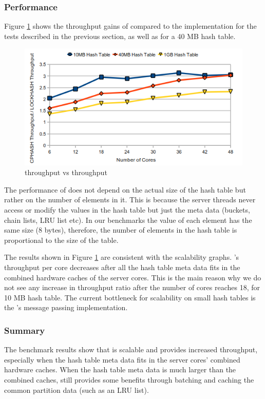 \subsubsection{Performance}

Figure \ref{fig:cphashspeedup} shows the throughput gains of \cphash{} compared to the \lockhash{} implementation for the tests described in 
the previous section, as well as for a 40 MB hash table.

\begin{figure}[!ht]
  \centering
  \includegraphics[width=0.8\linewidth]{figs/cphashspeedup.png}
  \caption{\cphash{} throughput vs \lockhash{} throughput}
  \label{fig:cphashspeedup}
\end{figure}

The performance of \cphash{} does not depend on the actual size of the hash table but rather on the number of elements in it. This is because the server 
threads never access or modify the values in the hash table but just the meta data (buckets, chain lists, LRU list etc). In our benchmarks the value of 
each element has the same size (8 bytes), therefore, the number of elements in the hash table is proportional to the size of the table.

The results shown in Figure \ref{fig:cphashspeedup} are consistent with the scalability graphs. \cphash{}'s throughput per core decreases after all 
the hash table meta data fits in the combined hardware caches of the server cores. This is the main reason why we do not see any increase in throughput ratio after 
the number of cores reaches 18, for 10 MB hash table. The current bottleneck for scalability on small hash tables is the \cphash{}'s message passing implementation.

\subsubsection{Summary}

The benchmark results show that \cphash{} is scalable and provides increased throughput, especially when the hash table meta data fits in the server cores'
combined hardware caches. When the hash table meta data is much larger than the combined caches, \cphash{} still provides some benefits through batching and caching 
the common partition data (such as an LRU list).

